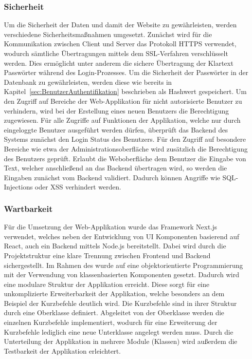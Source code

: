 \subsubsection{Sicherheit}
Um die Sicherheit der Daten und damit der Website zu gewährleisten, werden verschiedene Sicherheitsmaßnahmen umgesetzt.
Zunächst wird für die Kommunikation zwischen Client und Server das Protokoll \ac{HTTPS} verwendet, wodurch sämtliche Übertragungen mittels dem \ac{SSL}-Verfahren verschlüsselt werden.
Dies ermöglicht unter anderem die sichere Übertragung der Klartext Passwörter während des Login-Prozesses.
Um die Sicherheit der Passwörter in der Datenbank zu gewährleisten, werden diese wie bereits in Kapitel~\ref{sec:BenutzerAuthentifikation} beschrieben als Hashwert gespeichert.
\newparagraph
Um den Zugriff auf Bereiche der Web-Applikation für nicht autorisierte Benutzer zu verhindern, wird bei der Erstellung eines neuen Benutzers die Berechtigung  zugewiesen.
Für alle Zugriffe auf Funktionen der Applikation, welche nur durch eingeloggte Benutzer ausgeführt werden dürfen, überprüft das Backend des Systems zunächst den Login Status des Benutzers.
Für den Zugriff auf besondere Bereiche wie etwa der Administrationsoberfläche wird zusätzlich die Berechtigung des Benutzers geprüft.
\newparagraph
Erlaubt die Weboberfläche dem Benutzer die Eingabe von Text, welcher anschließend an das Backend übertragen wird, so werden die Eingaben zunächst vom Backend validiert.
Dadurch können Angriffe wie \ac{SQL}-Injections oder \ac{XSS} verhindert werden.

\subsubsection{Wartbarkeit}
Für die Umsetzung der Web-Applikation wurde das Framework Next.js verwendet, welches neben der Entwicklung von UI Komponenten basierend auf React, auch ein Backend mittels Node.js bereitstellt.
Dabei wird durch die Projektstruktur eine klare Trennung zwischen Frontend und Backend sichergestellt.
\newparagraph
Im Rahmen des  wurde auf eine objektorientierte Programmierung mit der Verwendung von klassenbasierten Komponenten gesetzt.
Dadurch wird eine modulare Struktur der Applikation erreicht.
Diese sorgt für eine unkomplizierte Erweiterbarkeit der Applikation, welche besonders an dem Beispiel der Kurzbefehle deutlich wird.
Die Kurzbefehle sind in ihrer Struktur durch eine Oberklasse definiert.
Abgeleitet von der Oberklasse werden die einzelnen Kurzbefehle implementiert, wodurch für eine Erweiterung der Kurzbefehle lediglich eine neue Unterklasse angelegt werden muss.
\newparagraph
Durch die Unterteilung der Applikation in mehrere Module (Klassen) wird außerdem die Testbarkeit der Applikation erleichtert.

